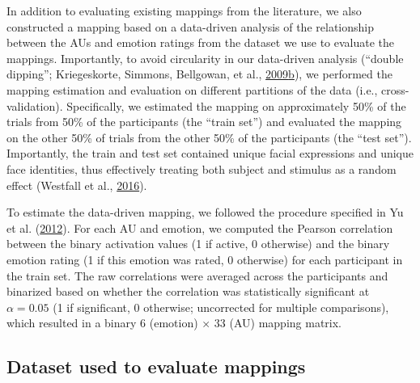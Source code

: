 \documentclass[11pt,american,a4paper,oneside,]{memoir} %
\begin{document}
In addition to evaluating existing mappings from the literature, we also constructed a mapping based on a data-driven analysis of the relationship between the AUs and emotion ratings from the dataset we use to evaluate the mappings. Importantly, to avoid circularity in our data-driven analysis (``double dipping''; Kriegeskorte, Simmons, Bellgowan, et al., \protect\hyperlink{ref-Kriegeskorte2009-yz}{2009}\protect\hyperlink{ref-Kriegeskorte2009-yz}{b}), we performed the mapping estimation and evaluation on different partitions of the data (i.e., cross-validation). Specifically, we estimated the mapping on approximately 50\% of the trials from 50\% of the participants (the ``train set'') and evaluated the mapping on the other 50\% of trials from the other 50\% of the participants (the ``test set''). Importantly, the train and test set contained unique facial expressions and unique face identities, thus effectively treating both subject and stimulus as a random effect (Westfall et al., \protect\hyperlink{ref-westfall2016fixing}{2016}).

To estimate the data-driven mapping, we followed the procedure specified in Yu et al. (\protect\hyperlink{ref-Yu2012-ag}{2012}). For each AU and emotion, we computed the Pearson correlation between the binary activation values (1 if active, 0 otherwise) and the binary emotion rating (1 if this emotion was rated, 0 otherwise) for each participant in the train set. The raw correlations were averaged across the participants and binarized based on whether the correlation was statistically significant at \(\alpha = 0.05\) (1 if significant, 0 otherwise; uncorrected for multiple comparisons), which resulted in a binary 6 (emotion) × 33 (AU) mapping matrix.

\hypertarget{hka-dataset}{%
\subsection{Dataset used to evaluate mappings}\label{hka-dataset}}
\end{document}
